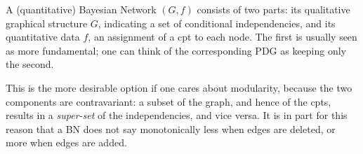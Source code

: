 \documentclass{article}
\numberwithin{equation}{section}
\begin{document}
		
	A (quantitative) Bayesian Network $(G, f)$ consists of two parts: its qualitative graphical structure $G$, indicating a set of conditional independencies, and its quantitative data $f$, an assignment of a cpt to each node.
	The first is usually seen as more fundamental;
%
	one can think of the corresponding PDG as keeping only the second. 
\begin{vfull}
	This is the more desirable option if one cares about
	modularity, because the two components are contravariant: a subset of
	the graph, and hence of the cpts, results in a \emph{super-set} of
	the independencies, and vice versa. It is in part for this reason
	that a BN does not say monotonically less when edges are deleted, or
	more when edges are added. 
\end{vfull}
\end{document}
